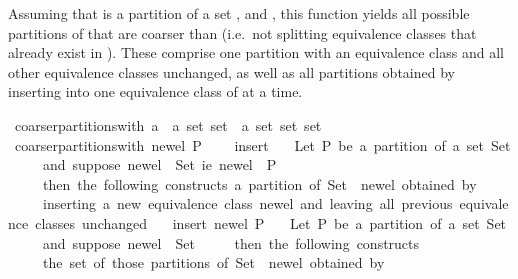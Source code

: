 \begin{isabellebody}
\begin{isamarkuptext}
Assuming that  is a partition of a set , and , this function yields
  all possible partitions of  that are coarser than 
  (i.e.\ not splitting equivalence classes that already exist in ).  These comprise one partition 
  with an equivalence class  and all other equivalence classes unchanged,
  as well as all partitions obtained by inserting  into one equivalence class of  at a time.%
\end{isamarkuptext}%
\isamarkuptrue%
\isamarkupfalse%
\ coarser{\isacharunderscore}partitions{\isacharunderscore}with\ {\isacharcolon}{\isacharcolon}{\isachardoublequoteopen}{\isacharprime}a\ {\isasymRightarrow}\ {\isacharprime}a\ set\ set\ {\isasymRightarrow}\ {\isacharprime}a\ set\ set\ set{\isachardoublequoteclose}\isanewline
{}\ {\isachardoublequoteopen}coarser{\isacharunderscore}partitions{\isacharunderscore}with\ new{\isacharunderscore}el\ P\ {\isacharequal}\ \isanewline
\ \ insert\isanewline
\ \ {\isacharparenleft}{\isacharasterisk}\ Let\ P\ be\ a\ partition\ of\ a\ set\ Set{\isacharcomma}\isanewline
\ \ \ \ \ and\ suppose\ new{\isacharunderscore}el\ {\isasymnotin}\ Set{\isacharcomma}\ i{\isachardot}e{\isachardot}\ {\isacharbraceleft}new{\isacharunderscore}el{\isacharbraceright}\ {\isasymnotin}\ P{\isacharcomma}\isanewline
\ \ \ \ \ then\ the\ following\ constructs\ a\ partition\ of\ {\isacharprime}Set\ {\isasymunion}\ {\isacharbraceleft}new{\isacharunderscore}el{\isacharbraceright}{\isacharprime}\ obtained\ by\isanewline
\ \ \ \ \ inserting\ a\ new\ equivalence\ class\ {\isacharbraceleft}new{\isacharunderscore}el{\isacharbraceright}\ and\ leaving\ all\ previous\ equivalence\ classes\ unchanged{\isachardot}\ {\isacharasterisk}{\isacharparenright}\isanewline
\ \ {\isacharparenleft}insert\ {\isacharbraceleft}new{\isacharunderscore}el{\isacharbraceright}\ P{\isacharparenright}\isanewline
\ \ {\isacharparenleft}{\isacharasterisk}\ Let\ P\ be\ a\ partition\ of\ a\ set\ Set{\isacharcomma}\isanewline
\ \ \ \ \ and\ suppose\ new{\isacharunderscore}el\ {\isasymnotin}\ Set{\isacharcomma}\isanewline
\ \ \ \ \ then\ the\ following\ constructs\isanewline
\ \ \ \ \ the\ set\ of\ those\ partitions\ of\ {\isacharprime}Set\ {\isasymunion}\ {\isacharbraceleft}new{\isacharunderscore}el{\isacharbraceright}{\isacharprime}\ obtained\ by\isanewline

\end{isabellebody}
